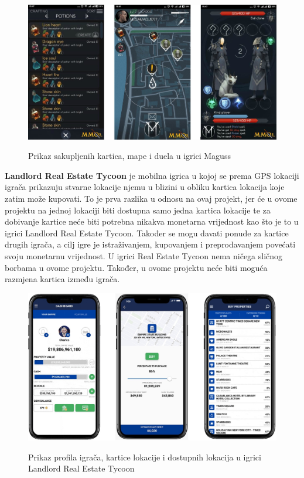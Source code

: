 		\begin{figure}[H]
			\centering
			\includegraphics[scale=0.4]{slike/Maguss} \\%
			\caption{Prikaz sakupljenih kartica, mape i duela u igrici Maguss}
			\label{fig:Maguss} %
		\end{figure}
	
		\textnormal{\textbf{Landlord Real Estate Tycoon} je mobilna igrica u kojoj se prema GPS lokaciji igrača prikazuju stvarne lokacije njemu u blizini u obliku kartica lokacija koje zatim može kupovati. To je prva razlika u odnosu na ovaj projekt, jer će u ovome projektu na jednoj lokaciji biti dostupna samo jedna kartica lokacije te za dobivanje kartice neće biti potrebna nikakva monetarna vrijednost kao što je to u igrici Landlord Real Estate Tycoon. Također se mogu davati ponude za kartice drugih igrača, a cilj igre je istraživanjem, kupovanjem i preprodavanjem povećati svoju monetarnu vrijednost. U igrici Real Estate Tycoon nema ničega sličnog borbama u ovome projektu. Također, u ovome projektu neće biti moguća razmjena kartica između igrača. }
		
		\begin{figure}[H]
			\centering
			\includegraphics[scale=0.45]{slike/Landlord} \\%
			\caption{Prikaz profila igrača, kartice lokacije i dostupnih lokacija u igrici Landlord Real Estate Tycoon}
			\label{fig:Landlord} %
		\end{figure}
	
